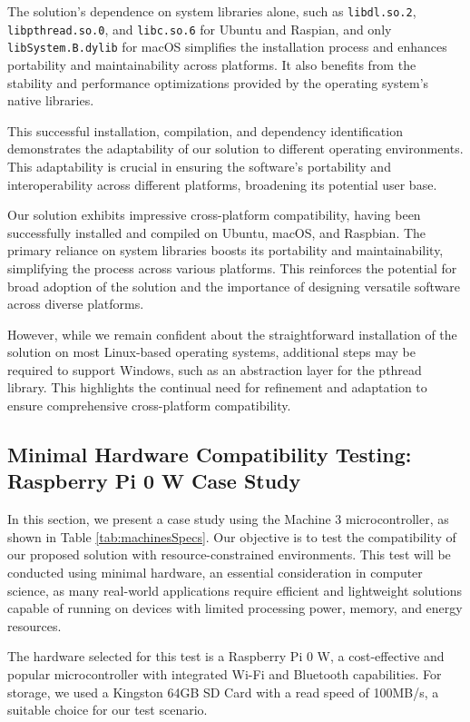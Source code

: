 \documentclass[a4paper,fleqn]{cas-dc}
\begin{document}
The solution's dependence on system libraries alone, such as \texttt{libdl.so.2}, \texttt{libpthread.so.0}, and \texttt{libc.so.6} for Ubuntu and Raspian, and only \texttt{libSystem.B.dylib} for macOS simplifies the installation process and enhances portability and maintainability across platforms. It also benefits from the stability and performance optimizations provided by the operating system's native libraries.

This successful installation, compilation, and dependency identification demonstrates the adaptability of our solution to different operating environments. This adaptability is crucial in ensuring the software's portability and interoperability across different platforms, broadening its potential user base.

Our solution exhibits impressive cross-platform compatibility, having been successfully installed and compiled on Ubuntu, macOS, and Raspbian. The primary reliance on system libraries boosts its portability and maintainability, simplifying the process across various platforms. This reinforces the potential for broad adoption of the solution and the importance of designing versatile software across diverse platforms.

However, while we remain confident about the straightforward installation of the solution on most Linux-based operating systems, additional steps may be required to support Windows, such as an abstraction layer for the pthread library. This highlights the continual need for refinement and adaptation to ensure comprehensive cross-platform compatibility.

\subsection{Minimal Hardware Compatibility Testing: Raspberry Pi 0 W Case Study}

In this section, we present a case study using the Machine 3 microcontroller, as shown in Table \ref{tab:machinesSpecs}. Our objective is to test the compatibility of our proposed solution with resource-constrained environments. This test will be conducted using minimal hardware, an essential consideration in computer science, as many real-world applications require efficient and lightweight solutions capable of running on devices with limited processing power, memory, and energy resources.

The hardware selected for this test is a Raspberry Pi 0 W, a cost-effective and popular microcontroller with integrated Wi-Fi and Bluetooth capabilities. For storage, we used a Kingston 64GB SD Card with a read speed of 100MB/s, a suitable choice for our test scenario.
\end{document}
